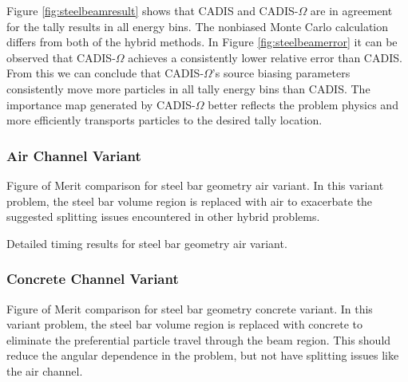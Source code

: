 Figure \ref{fig:steelbeamresult} shows that CADIS and CADIS-$\Omega$ are in
agreement for the tally results in all energy bins. The nonbiased Monte Carlo
calculation differs from both of the hybrid methods. In Figure
\ref{fig:steelbeamerror} it can be observed that CADIS-$\Omega$ achieves a
consistently lower relative error than CADIS. From this we can conclude that
CADIS-$\Omega$'s source biasing parameters consistently move more particles in
all tally energy bins than CADIS. The importance map generated by CADIS-$\Omega$
better reflects the problem physics and more efficiently transports particles to
the desired tally location.

\subsubsection{Air Channel Variant}
\label{subsubsec:airbeam}

\begin{table}[h!]
  \centering
  
  \caption[Figure of Merit comparison for steel bar geometry air variant.]
  {Figure of Merit comparison for steel bar geometry air variant. In this
  variant problem, the steel bar volume region is replaced with air to
exacerbate the suggested splitting issues encountered in other hybrid problems. }
  \label{tab:airbeamfoms}
\end{table}

\begin{table}[h!]
  \centering
  
  \caption[Detailed timing results for steel bar geometry air variant.]
  {Detailed timing results for steel bar geometry air variant.}
  \label{tab:airbeamtimes}
\end{table}

\subsubsection{Concrete Channel Variant}
\label{subsubsec:concretebeam}

\begin{table}[h!]
  \centering
  
  \caption[Figure of Merit comparison for steel bar geometry concrete variant.]
  {Figure of Merit comparison for steel bar geometry concrete variant. In this
  variant problem, the steel bar volume region is replaced with concrete to
  eliminate the preferential particle travel through the beam region. This
  should reduce the angular dependence in the problem, but not have splitting
  issues like the air channel. }
  \label{tab:airbeamfoms}
\end{table}

